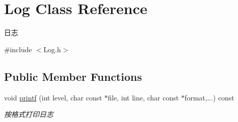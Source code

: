 \hypertarget{class_log}{}\section{Log Class Reference}
\label{class_log}


日志  




{\ttfamily \#include $<$Log.\+h$>$}

\subsection*{Public Member Functions}
\begin{DoxyCompactItemize}
\item 
void \hyperlink{class_log_ab91d69d448051c3d127c0dac54b7869b}{printf} (int level, char const $\ast$file, int line, char const $\ast$format,...) const
\begin{DoxyCompactList}\small\item\em 按格式打印日志 \end{DoxyCompactList}\end{DoxyCompactItemize}
